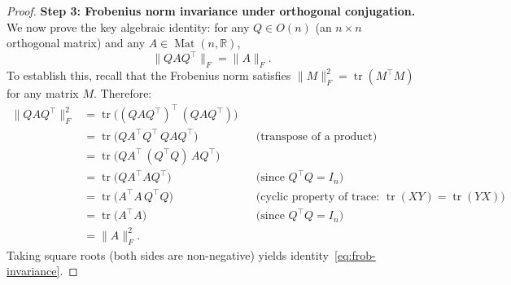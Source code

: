 \begin{proof}
\medskip\noindent\textbf{Step 3: Frobenius norm invariance under orthogonal conjugation.}
We now prove the key algebraic identity: for any $Q \in O(n)$ (an $n \times n$ orthogonal
matrix) and any $A \in \operatorname{Mat}(n, \mathbb{R})$,
\begin{equation}
\label{eq:frob-invariance}
    \|Q A Q^\top\|_F = \|A\|_F.
\end{equation}
To establish this, recall that the Frobenius norm satisfies $\|M\|_F^2 =
\operatorname{tr}(M^\top M)$ for any matrix $M$. Therefore:
\begin{align*}
    \|Q A Q^\top\|_F^2
    &= \operatorname{tr}\!\big((Q A Q^\top)^\top\, (Q A Q^\top)\big) \\
    &= \operatorname{tr}\!\big(Q A^\top Q^\top\, Q A Q^\top\big)
      && \text{(transpose of a product)} \\
    &= \operatorname{tr}\!\big(Q A^\top\, (Q^\top Q)\, A Q^\top\big) \\
    &= \operatorname{tr}\!\big(Q A^\top A Q^\top\big)
      && \text{(since } Q^\top Q = I_n \text{)} \\
    &= \operatorname{tr}\!\big(A^\top A\, Q^\top Q\big)
      && \text{(cyclic property of trace: } \operatorname{tr}(XY) = \operatorname{tr}(YX)\text{)} \\
    &= \operatorname{tr}\!\big(A^\top A\big)
      && \text{(since } Q^\top Q = I_n \text{)} \\
    &= \|A\|_F^2.
\end{align*}
Taking square roots (both sides are non-negative) yields identity~\eqref{eq:frob-invariance}.


\end{proof}
